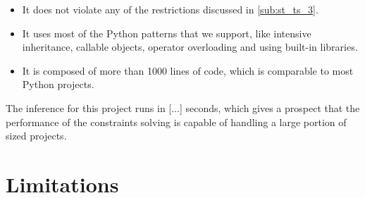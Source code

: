 \begin{itemize}
	\item It does not violate any of the restrictions discussed in \ref{sub:st_ts_3}.
	\item It uses most of the Python patterns that we support, like intensive inheritance, callable objects, operator overloading and using built-in libraries.
	\item It is composed of more than 1000 lines of code, which is comparable to most Python projects.
\end{itemize}
The inference for this project runs in [...] seconds, which gives a prospect that the performance of the constraints solving is capable of handling a large portion of sized projects.

\section{Limitations}